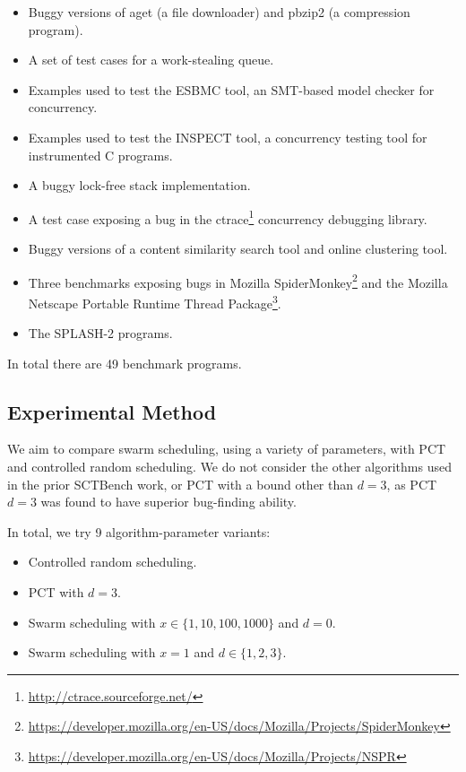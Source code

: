 \begin{itemize}
\item Buggy versions of aget (a file downloader) and pbzip2 (a compression
program).
\item A set of test cases for a work-stealing queue.
\item Examples used to test the ESBMC tool\cite{cordeiro2011}, an SMT-based
model checker for concurrency.
\item Examples used to test the INSPECT tool\cite{yang2008}, a concurrency
testing tool for instrumented C programs.
\item A buggy lock-free stack implementation.
\item A test case exposing a bug in the
ctrace\footnote{\url{http://ctrace.sourceforge.net/}} concurrency debugging
library.
\item Buggy versions of a content similarity search tool and online clustering
tool.
\item Three benchmarks exposing bugs in Mozilla
SpiderMonkey\footnote{\url{https://developer.mozilla.org/en-US/docs/Mozilla/Projects/SpiderMonkey}}
and the Mozilla Netscape Portable Runtime Thread Package\footnote{\url{https://developer.mozilla.org/en-US/docs/Mozilla/Projects/NSPR}}.
\item The SPLASH-2 programs\cite{woo1995}.
\end{itemize}

In total there are 49 benchmark programs.

\subsection{Experimental Method}
\label{sec:algorithms-eval-method}

We aim to compare swarm scheduling, using a variety of parameters, with PCT and
controlled random scheduling.  We do not consider the other algorithms used in
the prior SCTBench work, or PCT with a bound other than $d=3$, as PCT $d=3$ was
found to have superior bug-finding ability\cite{thomson2016}.

In total, we try 9 algorithm-parameter variants:

\begin{itemize}
\item Controlled random scheduling.
\item PCT with $d=3$.
\item Swarm scheduling with $x \in \{1,10,100,1000\}$ and $d=0$.
\item Swarm scheduling with $x=1$ and $d \in \{1,2,3\}$.
\end{itemize}

